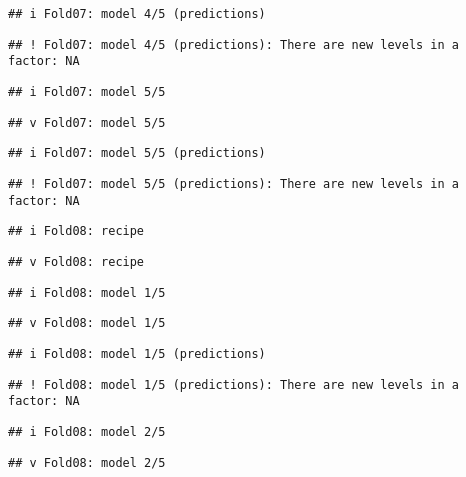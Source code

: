 \documentclass[
]{article}
\begin{document}
\begin{verbatim}
## i Fold07: model 4/5 (predictions)
\end{verbatim}

\begin{verbatim}
## ! Fold07: model 4/5 (predictions): There are new levels in a factor: NA
\end{verbatim}

\begin{verbatim}
## i Fold07: model 5/5
\end{verbatim}

\begin{verbatim}
## v Fold07: model 5/5
\end{verbatim}

\begin{verbatim}
## i Fold07: model 5/5 (predictions)
\end{verbatim}

\begin{verbatim}
## ! Fold07: model 5/5 (predictions): There are new levels in a factor: NA
\end{verbatim}

\begin{verbatim}
## i Fold08: recipe
\end{verbatim}

\begin{verbatim}
## v Fold08: recipe
\end{verbatim}

\begin{verbatim}
## i Fold08: model 1/5
\end{verbatim}

\begin{verbatim}
## v Fold08: model 1/5
\end{verbatim}

\begin{verbatim}
## i Fold08: model 1/5 (predictions)
\end{verbatim}

\begin{verbatim}
## ! Fold08: model 1/5 (predictions): There are new levels in a factor: NA
\end{verbatim}

\begin{verbatim}
## i Fold08: model 2/5
\end{verbatim}

\begin{verbatim}
## v Fold08: model 2/5
\end{verbatim}
\end{document}
